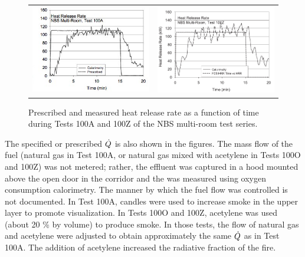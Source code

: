 \begin{figure}[\figoptions{t}]
\begin{center}
\begin{tabular}{cc}
\includegraphics[width=3.0in]{FIGURES/NBS/NBS_HRR_100A} & \includegraphics[width=3.0in]{FIGURES/NBS/NBS_HRR_100Z}\\
\end{tabular}
\end{center}
\caption{Prescribed and measured heat release rate as a function of time during Tests 100A and 100Z of the NBS multi-room test series.}
 \label{fig:NBS_HRR}
\end{figure}

The specified or prescribed  $\dot{Q}$ is also shown in the figures.   The mass flow of the fuel (natural gas in Test 100A, or natural gas mixed with acetylene in Tests 100O and 100Z) was not metered; rather, the effluent was captured in a hood mounted above the open door in the corridor and the   was measured using oxygen consumption calorimetry.  The manner by which the fuel flow was controlled is not documented.  In Test 100A, candles were used to increase smoke in the upper layer to promote visualization. In Tests 100O and 100Z, acetylene was used (about 20 \% by volume) to produce smoke.  In those tests, the flow of natural gas and acetylene were adjusted to obtain approximately the same $\dot{Q}$  as in Test 100A.  The addition of acetylene increased the radiative fraction of the fire.

